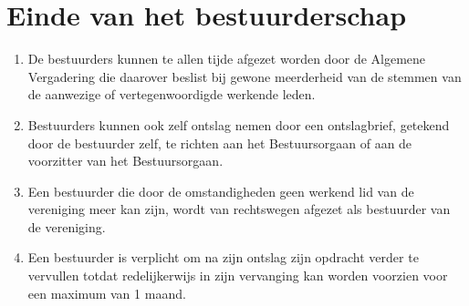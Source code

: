     \section{Einde van het bestuurderschap}
    \begin{enumerate}
    \item De bestuurders kunnen te allen tijde afgezet worden door de Algemene Vergadering die daarover beslist bij gewone meerderheid van de stemmen van de aanwezige of vertegenwoordigde werkende leden. 
    \item Bestuurders kunnen ook zelf ontslag nemen door een ontslagbrief, getekend door de bestuurder zelf, te richten aan het Bestuursorgaan of aan de voorzitter van het Bestuursorgaan. 
    \item Een bestuurder die door de omstandigheden geen werkend lid van de vereniging meer kan zijn, wordt van rechtswegen afgezet als bestuurder van de vereniging.
    \item Een bestuurder is verplicht om na zijn ontslag zijn opdracht verder te vervullen totdat redelijkerwijs in zijn vervanging kan worden voorzien voor een maximum van 1 maand. 
    \end{enumerate}

